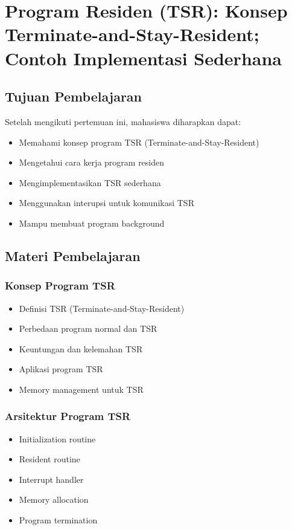 \chapter{Program Residen (TSR): Konsep Terminate-and-Stay-Resident; Contoh Implementasi Sederhana}

\section{Tujuan Pembelajaran}
Setelah mengikuti pertemuan ini, mahasiswa diharapkan dapat:
\begin{itemize}
\item Memahami konsep program TSR (Terminate-and-Stay-Resident)
\item Mengetahui cara kerja program residen
\item Mengimplementasikan TSR sederhana
\item Menggunakan interupsi untuk komunikasi TSR
\item Mampu membuat program background
\end{itemize}

\section{Materi Pembelajaran}

\subsection{Konsep Program TSR}
\begin{itemize}
\item Definisi TSR (Terminate-and-Stay-Resident)
\item Perbedaan program normal dan TSR
\item Keuntungan dan kelemahan TSR
\item Aplikasi program TSR
\item Memory management untuk TSR
\end{itemize}

\subsection{Arsitektur Program TSR}
\begin{itemize}
\item Initialization routine
\item Resident routine
\item Interrupt handler
\item Memory allocation
\item Program termination
\end{itemize}

